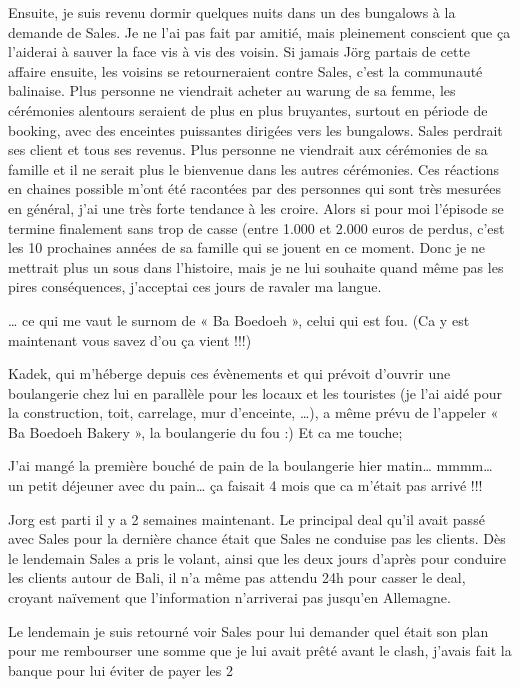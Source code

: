 Ensuite, je suis revenu dormir quelques nuits dans un des bungalows à la demande de Sales. Je ne l’ai pas fait par amitié, mais pleinement conscient que ça l’aiderai à sauver la face vis à vis des voisin. Si jamais Jörg partais de cette affaire ensuite, les voisins se retourneraient contre Sales, c’est la communauté balinaise. Plus personne ne viendrait acheter au warung de sa femme, les cérémonies alentours seraient de plus en plus bruyantes, surtout en période de booking, avec des enceintes puissantes dirigées vers les bungalows. Sales perdrait ses client et tous ses revenus. Plus personne ne viendrait aux cérémonies de sa famille et il ne serait plus le bienvenue dans les autres cérémonies. Ces réactions en chaines possible m’ont été racontées par des personnes qui sont très mesurées en général, j’ai une très forte tendance à les croire. Alors si pour moi l’épisode se termine finalement sans trop de casse (entre 1.000 et 2.000 euros de perdus, c’est les 10 prochaines années de sa famille qui se jouent en ce moment. Donc je ne mettrait plus un sous dans l’histoire, mais je ne lui souhaite quand même pas les pires conséquences, j’acceptai ces jours de ravaler ma langue.

… ce qui me vaut le surnom de « Ba Boedoeh », celui qui est fou. (Ca y est maintenant vous savez d’ou ça vient !!!)

Kadek, qui m’héberge depuis ces évènements et qui prévoit d’ouvrir une boulangerie chez lui en parallèle pour les locaux et les touristes (je l’ai aidé pour la construction, toit, carrelage, mur d’enceinte, …), a même prévu de l’appeler « Ba Boedoeh Bakery », la boulangerie du fou :) Et ca me touche;

J’ai mangé la première bouché de pain de la boulangerie hier matin… mmmm… un petit déjeuner avec du pain… ça faisait 4 mois que ca m’était pas arrivé !!!

Jorg est parti il y a 2 semaines maintenant. Le principal deal qu’il avait passé avec Sales pour la dernière chance était que Sales ne conduise pas les clients. Dès le lendemain Sales a pris le volant, ainsi que les deux jours d’après pour conduire les clients autour de Bali, il n’a même pas attendu 24h pour casser le deal, croyant naïvement que l’information n’arriverai pas jusqu’en Allemagne.

Le lendemain je suis retourné voir Sales pour lui demander quel était son plan pour me rembourser une somme que je lui avait prêté avant le clash, j’avais fait la banque pour lui éviter de payer les 2%

